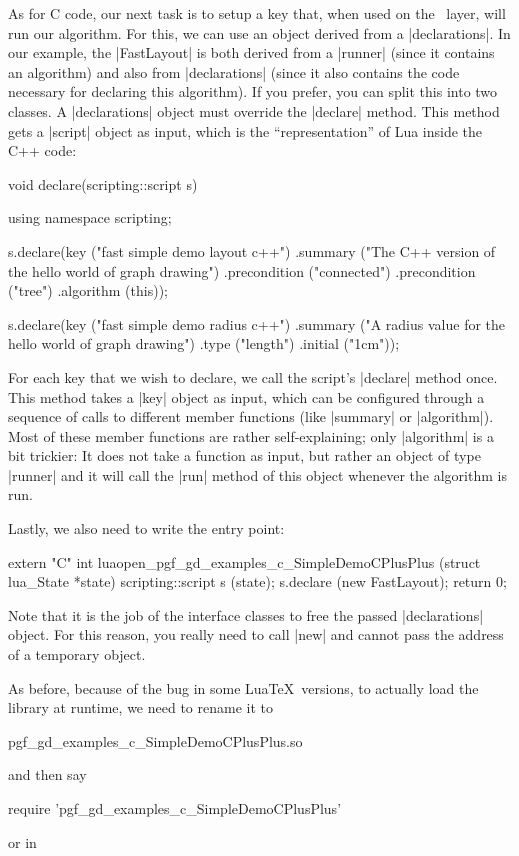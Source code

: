 As for C code, our next task is to setup a key that, when used on the
\tikzname\ layer, will run our algorithm. For this, we can use an object
derived from a |declarations|. In our example, the |FastLayout| is both derived
from a |runner| (since it contains an algorithm) and also from |declarations|
(since it also contains the code necessary for declaring this algorithm). If
you prefer, you can split this into two classes. A |declarations| object must
override the |declare| method. This method gets a |script| object as input,
which is the ``representation'' of Lua inside the C++ code:
%
\begin{codeexample}[code only, tikz syntax=false]
void declare(scripting::script s) {
  using namespace scripting;

  s.declare(key ("fast simple demo layout c++")
            .summary ("The C++ version of the hello world of graph drawing")
            .precondition ("connected")
            .precondition ("tree")
            .algorithm (this));

  s.declare(key ("fast simple demo radius c++")
            .summary ("A radius value for the hello world of graph drawing")
            .type ("length")
            .initial ("1cm"));
}
\end{codeexample}

For each key that we wish to declare, we call the script's |declare| method
once. This method takes a |key| object as input, which can be configured
through a sequence of calls to different member functions (like |summary| or
|algorithm|). Most of these member functions are rather self-explaining; only
|algorithm| is a bit trickier: It does not take a function as input, but rather
an object of type |runner| and it will call the |run| method of this object
whenever the algorithm is run.

Lastly, we also need to write the entry point:
%
\begin{codeexample}[code only, tikz syntax=false]
extern "C" int luaopen_pgf_gd_examples_c_SimpleDemoCPlusPlus (struct lua_State *state) {
  scripting::script s (state);
  s.declare (new FastLayout);
  return 0;
}
\end{codeexample}

Note that it is the job of the interface classes to free the passed
|declarations| object. For this reason, you really need to call |new| and
cannot pass the address of a temporary object.

As before, because of the bug in some Lua\TeX\ versions, to actually load the
library at runtime, we need to rename it to
%
\begin{codeexample}[code only, tikz syntax=false]
pgf_gd_examples_c_SimpleDemoCPlusPlus.so
\end{codeexample}
%
and then say
%
\begin{codeexample}[code only, tikz syntax=false]
require 'pgf_gd_examples_c_SimpleDemoCPlusPlus'
\end{codeexample}
%
or in \tikzname
%
\begin{codeexample}
\end{codeexample}

